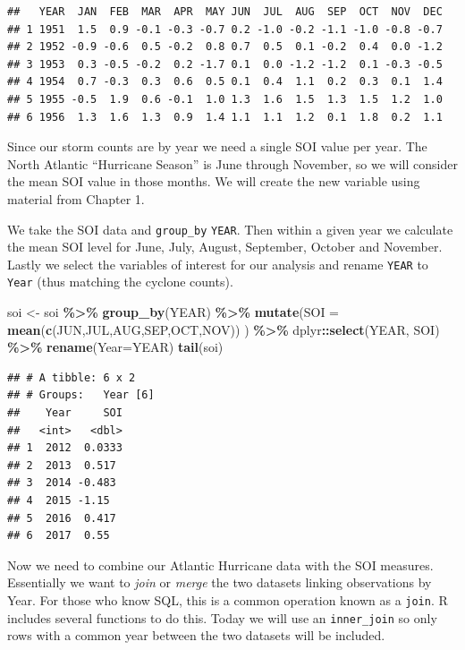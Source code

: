 \documentclass[
]{book}
\newenvironment{Shaded}{\begin{snugshade}}{\end{snugshade}}
\newcommand{\AttributeTok}[1]{\textcolor[rgb]{0.13,0.29,0.53}{#1}}
\newcommand{\FunctionTok}[1]{\textcolor[rgb]{0.13,0.29,0.53}{\textbf{#1}}}
\newcommand{\NormalTok}[1]{#1}
\newcommand{\OtherTok}[1]{\textcolor[rgb]{0.56,0.35,0.01}{#1}}
\newcommand{\SpecialCharTok}[1]{\textcolor[rgb]{0.81,0.36,0.00}{\textbf{#1}}}
\begin{document}
\begin{verbatim}
##   YEAR  JAN  FEB  MAR  APR  MAY JUN  JUL  AUG  SEP  OCT  NOV  DEC
## 1 1951  1.5  0.9 -0.1 -0.3 -0.7 0.2 -1.0 -0.2 -1.1 -1.0 -0.8 -0.7
## 2 1952 -0.9 -0.6  0.5 -0.2  0.8 0.7  0.5  0.1 -0.2  0.4  0.0 -1.2
## 3 1953  0.3 -0.5 -0.2  0.2 -1.7 0.1  0.0 -1.2 -1.2  0.1 -0.3 -0.5
## 4 1954  0.7 -0.3  0.3  0.6  0.5 0.1  0.4  1.1  0.2  0.3  0.1  1.4
## 5 1955 -0.5  1.9  0.6 -0.1  1.0 1.3  1.6  1.5  1.3  1.5  1.2  1.0
## 6 1956  1.3  1.6  1.3  0.9  1.4 1.1  1.1  1.2  0.1  1.8  0.2  1.1
\end{verbatim}

Since our storm counts are by year we need a single SOI value per year. The North Atlantic ``Hurricane Season'' is June through November, so we will consider the mean SOI value in those months. We will create the new variable using material from Chapter 1.

We take the SOI data and \texttt{group\_by} \texttt{YEAR}. Then within a given year we calculate the mean SOI level for June, July, August, September, October and November. Lastly we select the variables of interest for our analysis and rename \texttt{YEAR} to \texttt{Year} (thus matching the cyclone counts).

\begin{Shaded}
\begin{Highlighting}[]
\NormalTok{soi }\OtherTok{\textless{}{-}}\NormalTok{ soi }\SpecialCharTok{\%\textgreater{}\%}
  \FunctionTok{group\_by}\NormalTok{(YEAR) }\SpecialCharTok{\%\textgreater{}\%}
  \FunctionTok{mutate}\NormalTok{(}\AttributeTok{SOI =} \FunctionTok{mean}\NormalTok{(}\FunctionTok{c}\NormalTok{(JUN,JUL,AUG,SEP,OCT,NOV)) ) }\SpecialCharTok{\%\textgreater{}\%}
\NormalTok{  dplyr}\SpecialCharTok{::}\FunctionTok{select}\NormalTok{(YEAR, SOI) }\SpecialCharTok{\%\textgreater{}\%}
  \FunctionTok{rename}\NormalTok{(}\AttributeTok{Year=}\NormalTok{YEAR)}
\FunctionTok{tail}\NormalTok{(soi)}
\end{Highlighting}
\end{Shaded}

\begin{verbatim}
## # A tibble: 6 x 2
## # Groups:   Year [6]
##    Year     SOI
##   <int>   <dbl>
## 1  2012  0.0333
## 2  2013  0.517 
## 3  2014 -0.483 
## 4  2015 -1.15  
## 5  2016  0.417 
## 6  2017  0.55
\end{verbatim}

Now we need to combine our Atlantic Hurricane data with the SOI measures. Essentially we want to \emph{join} or \emph{merge} the two datasets linking observations by Year. For those who know SQL, this is a common operation known as a \texttt{join}. R includes several functions to do this. Today we will use an \texttt{inner\_join} so only rows with a common year between the two datasets will be included.
\end{document}
